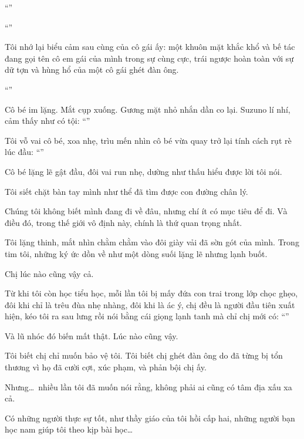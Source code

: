 \documentclass[../main.tex]{subfiles}
\begin{document}
``''

``''

Tôi nhớ lại biểu cảm sau cùng của cô gái ấy: một khuôn mặt khắc khổ và bế tác đang gọi tên cô em gái của mình trong sự cùng cực, trái ngược hoàn toàn với sự dữ tợn và hùng hổ của một cô gái ghét đàn ông.

``''

Cô bé im lặng. Mắt cụp xuống. Gương mặt nhỏ nhắn dần co lại. Suzuno lí nhí, cảm thấy như có tội: ``''

Tôi vỗ vai cô bé, xoa nhẹ, trìu mến nhìn cô bé vừa quay trở lại tính cách rụt rè lúc đầu: ``''

Cô bé lặng lẽ gật đầu, đôi vai run nhẹ, dường như thấu hiểu được lời tôi nói.

Tôi siết chặt bàn tay mình như thể đã tìm được con đường chân lý.

Chúng tôi không biết mình đang đi về đâu, nhưng chí ít có mục tiêu để đi. Và điều đó, trong thế giới vô định này, chính là thứ quan trọng nhất.


Tôi lặng thinh, mắt nhìn chằm chằm vào đôi giày vải đã sờn gót của mình. Trong tim tôi, những ký ức dồn về như một dòng suối lặng lẽ nhưng lạnh buốt.

Chị lúc nào cũng vậy cả.

Từ khi tôi còn học tiểu học, mỗi lần tôi bị mấy đứa con trai trong lớp chọc ghẹo, đôi khi chỉ là trêu đùa nhẹ nhàng, đôi khi là ác ý, chị đều là người đầu tiên xuất hiện, kéo tôi ra sau lưng rồi nói bằng cái giọng lạnh tanh mà chỉ chị mới có: ``''

Và lũ nhóc đó biến mất thật. Lúc nào cũng vậy.

Tôi biết chị chỉ muốn bảo vệ tôi. Tôi biết chị ghét đàn ông do đã từng bị tổn thương vì họ đã cười cợt, xúc phạm, và phản bội chị ấy.

Nhưng\dots\ nhiều lần tôi đã muốn nói rằng, không phải ai cũng có tâm địa xấu xa cả.

Có những người thực sự tốt, như thầy giáo của tôi hồi cấp hai, những người bạn học nam giúp tôi theo kịp bài học\dots
\end{document}
